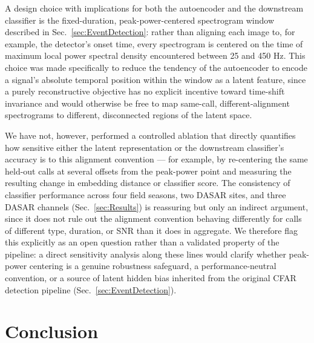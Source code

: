 \documentclass[preprint,NumberedRefs]{JASAnew}
\begin{document}
A design choice with implications for both the autoencoder and the
downstream classifier is the fixed-duration, peak-power-centered spectrogram
window described in Sec.~\ref{sec:EventDetection}: rather than aligning each
image to, for example, the detector's onset time, every spectrogram is
centered on the time of maximum local power spectral density encountered
between 25 and 450 Hz. This choice was made specifically to reduce the
tendency of the autoencoder to encode a signal's absolute temporal position
within the window as a latent feature, since a purely reconstructive
objective has no explicit incentive toward time-shift invariance and would
otherwise be free to map same-call, different-alignment spectrograms to
different, disconnected regions of the latent space.

We have not, however, performed a controlled ablation that directly
quantifies how sensitive either the latent representation or the downstream
classifier's accuracy is to this alignment convention — for example, by
re-centering the same held-out calls at several offsets from the peak-power
point and measuring the resulting change in embedding distance or classifier
score. The consistency of classifier performance across four field seasons,
two DASAR sites, and three DASAR channels (Sec.~\ref{sec:Results}) is
reassuring but only an indirect argument, since it does not rule out the
alignment convention behaving differently for calls of different type,
duration, or SNR than it does in aggregate. We therefore flag this
explicitly as an open question rather than a validated property of the
pipeline: a direct sensitivity analysis along these lines would clarify
whether peak-power centering is a genuine robustness safeguard, a
performance-neutral convention, or a source of latent hidden bias inherited
from the original CFAR detection pipeline (Sec.~\ref{sec:EventDetection}).

\section{\label{sec:Conclusion}Conclusion}
\end{document}
